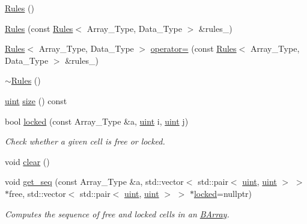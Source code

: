 \begin{DoxyCompactItemize}
\item 
\hyperlink{class_rules_aa78e9abf82ed8a0e4320d570191c8968}{Rules} ()
\item 
\hyperlink{class_rules_a57f5ab44febba391b2a06d163d25b237}{Rules} (const \hyperlink{class_rules}{Rules}$<$ Array\+\_\+\+Type, Data\+\_\+\+Type $>$ \&rules\+\_\+)
\item 
\hyperlink{class_rules}{Rules}$<$ Array\+\_\+\+Type, Data\+\_\+\+Type $>$ \hyperlink{class_rules_ab87544febb8301772164570708bd708e}{operator=} (const \hyperlink{class_rules}{Rules}$<$ Array\+\_\+\+Type, Data\+\_\+\+Type $>$ \&rules\+\_\+)
\item 
\hyperlink{class_rules_aa76d96c2316bc4a2a26bf4ec7b8d9463}{$\sim$\+Rules} ()
\item 
\hyperlink{typedefs_8hpp_a91ad9478d81a7aaf2593e8d9c3d06a14}{uint} \hyperlink{class_rules_a2f230f733e9936443af660bc890610ef}{size} () const
\item 
bool \hyperlink{class_rules_a51540e67c97559216cf84f8a7e230ea7}{locked} (const Array\+\_\+\+Type \&a, \hyperlink{typedefs_8hpp_a91ad9478d81a7aaf2593e8d9c3d06a14}{uint} i, \hyperlink{typedefs_8hpp_a91ad9478d81a7aaf2593e8d9c3d06a14}{uint} j)
\begin{DoxyCompactList}\small\item\em Check whether a given cell is free or locked. \end{DoxyCompactList}\item 
void \hyperlink{class_rules_a135a15d3ff70d4350d76a15f8e85f7df}{clear} ()
\item 
void \hyperlink{class_rules_afc2e6ddd9cf384f9e70896ad6e581ed4}{get\+\_\+seq} (const Array\+\_\+\+Type \&a, std\+::vector$<$ std\+::pair$<$ \hyperlink{typedefs_8hpp_a91ad9478d81a7aaf2593e8d9c3d06a14}{uint}, \hyperlink{typedefs_8hpp_a91ad9478d81a7aaf2593e8d9c3d06a14}{uint} $>$ $>$ $\ast$free, std\+::vector$<$ std\+::pair$<$ \hyperlink{typedefs_8hpp_a91ad9478d81a7aaf2593e8d9c3d06a14}{uint}, \hyperlink{typedefs_8hpp_a91ad9478d81a7aaf2593e8d9c3d06a14}{uint} $>$ $>$ $\ast$\hyperlink{class_rules_a51540e67c97559216cf84f8a7e230ea7}{locked}=nullptr)
\begin{DoxyCompactList}\small\item\em Computes the sequence of free and locked cells in an \hyperlink{class_b_array}{B\+Array}. \end{DoxyCompactList}\end{DoxyCompactItemize}
